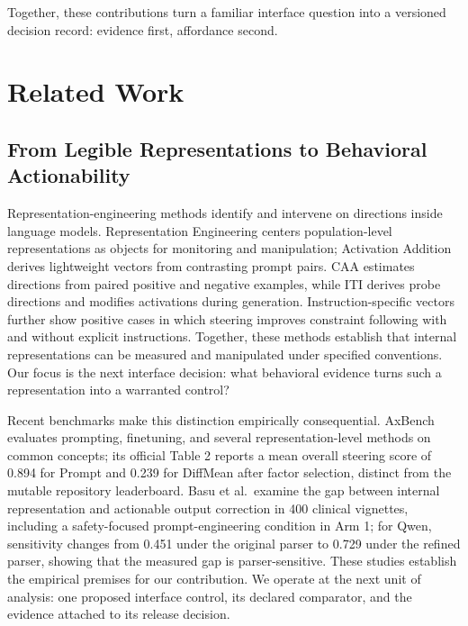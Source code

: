 \documentclass[manuscript,review,anonymous]{acmart}
\begin{document}
Together, these contributions turn a familiar interface question into a versioned decision record: evidence first, affordance second.

\section{Related Work}\label{related-work}

\subsection{From Legible Representations to Behavioral Actionability}\label{from-legible-representations-to-behavioral-actionability}

Representation-engineering methods identify and intervene on directions inside language models. Representation Engineering centers population-level representations as objects for monitoring and manipulation; Activation Addition derives lightweight vectors from contrasting prompt pairs. \cite{zou2023repe,turner2023actadd} CAA estimates directions from paired positive and negative examples, while ITI derives probe directions and modifies activations during generation. \cite{rimsky2024caa,li2023iti} Instruction-specific vectors further show positive cases in which steering improves constraint following with and without explicit instructions. \cite{stolfo2025instr} {}%
Together, these methods establish that internal representations can be measured and manipulated under specified conventions. Our focus is the next interface decision: what behavioral evidence turns such a representation into a warranted control?

Recent benchmarks make this distinction empirically consequential. AxBench evaluates prompting, finetuning, and several representation-level methods on common concepts; its official Table 2 reports a mean overall steering score of 0.894 for Prompt and 0.239 for DiffMean after factor selection, distinct from the mutable repository leaderboard. \cite{wu2025axbench} {}%
Basu et al.~examine the gap between internal representation and actionable output correction in 400 clinical vignettes, including a safety-focused prompt-engineering condition in Arm 1; for Qwen, sensitivity changes from 0.451 under the original parser to 0.729 under the refined parser, showing that the measured gap is parser-sensitive. \cite{basu2026actionability} {}%
These studies establish the empirical premises for our contribution. We operate at the next unit of analysis: one proposed interface control, its declared comparator, and the evidence attached to its release decision.
\end{document}
